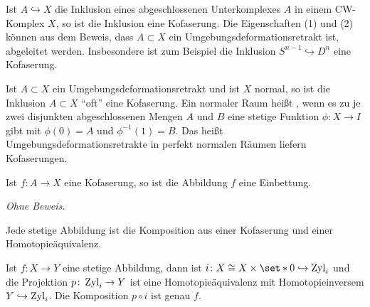 \begin{beispiel}[{name=[Kofaserung bei CW-Komplexen]}]
	Ist $A \hookrightarrow X$ die Inklusion eines abgeschlossenen Unterkomplexes $A$ in einem CW-Komplex $X$, so ist die Inklusion eine Kofaserung.
	Die Eigenschaften (1) und (2) können aus dem Beweis, dass $A \subset X$ ein Umgebungsdeformationsretrakt ist, abgeleitet werden.
		Insbesondere ist zum Beispiel die Inklusion $S^{n-1} \hookrightarrow D^n$ eine Kofaserung.
\end{beispiel}

\begin{bemerkung}[{name=[Umgebungsdeformationsretrakte in perfekt normalen Räumen]}]
	Ist $A \subset X$ ein Umgebungsdeformationsretrakt und ist $X$ normal, so ist die Inklusion $A \subset X$ \enquote{oft} eine Kofaserung.
	Ein normaler Raum heißt , wenn es zu je zwei disjunkten abgeschlossenen Mengen $A$ und $B$ eine stetige Funktion $\phi \colon X \to I$ gibt mit $\phi(0) =A$ und $\phi^{-1}(1)=B$.
	Das heißt Umgebungsdeformationsretrakte in perfekt normalen Räumen liefern Kofaserungen.
\end{bemerkung}

\begin{satz}[{name=[Kofaserungen sind Einbettungen]}]
	Ist $f \colon A \to X$ eine Kofaserung, so ist die Abbildung $f$ eine Einbettung.
\end{satz}
\begin{beweis}
	\emph{Ohne Beweis.}
\end{beweis}

\begin{satz}[{name=[stetige Abbildungen als Kofaserung]}]
	Jede stetige Abbildung ist die Komposition aus einer Kofaserung und einer Homotopieäquivalenz.
\end{satz}
\begin{beweis}
	Ist $f \colon X \to Y$ eine stetige Abbildung, dann ist $i \colon X \cong X \times \set*{0} \hookrightarrow \Zyl_i$ und die Projektion $p \colon \operatorname{Zyl}_i \to Y$ ist eine Homotopieäquivalenz mit Homotopieinversem $Y \hookrightarrow \operatorname{Zyl}_i$.
	Die Komposition $p \circ i$ ist genau $f$.
\end{beweis}

